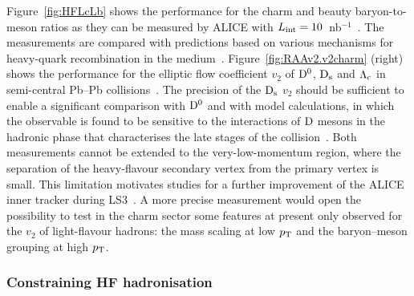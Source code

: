Figure~\ref{fig:HFLcLb} shows the performance for the charm and beauty baryon-to-meson ratios as they can be measured by ALICE with $L_{\rm int}=10$~nb$^{-1}$~\cite{Abelev:1625842}. The measurements are compared with predictions based on various mechanisms for heavy-quark recombination in the medium~\cite{Plumari:2017ntm,Oh:2009zj}.
Figure~\ref{fig:RAAv2.v2charm} (right) shows the performance for the elliptic flow coefficient $v_2$ of $\rm D^0$, $\rm D_s$ and $\rm \Lambda_c$ 
in semi-central Pb--Pb collisions~\cite{Abelev:1625842}. The precision of the $\rm D_s$ $v_2$ should be sufficient to enable a significant comparison with $\rm D^0$ and with model calculations, in which the 
observable is found to be sensitive to the interactions of $\rm D$ mesons in the hadronic phase that characterises the late stages of the collision~\cite{He:2014cla}. 
Both measurements cannot be extended to the very-low-momentum region, where the separation of the heavy-flavour secondary vertex from the primary vertex is small.  
This limitation motivates studies for a further improvement of the ALICE inner tracker during LS3~\cite{ALICEITS3}.  A more precise measurement would open the possibility to test in the charm sector some features at present only observed for the $v_2$ of light-flavour hadrons: the mass scaling at low $p_{\rm T}$ and 
the baryon--meson grouping at high $p_{\rm T}$.




\subsubsection{Constraining HF hadronisation}
\label{sec:HFhadro3}


